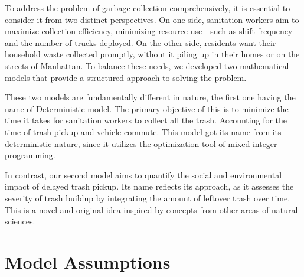 \documentclass{article}
\begin{document}

To address the problem of garbage collection comprehensively, it is essential to consider it from two distinct perspectives. On one side, sanitation workers aim to maximize collection efficiency, minimizing resource use—such as shift frequency and the number of trucks deployed. On the other side, residents want their household waste collected promptly, without it piling up in their homes or on the streets of Manhattan. To balance these needs, we developed two mathematical models that provide a structured approach to solving the problem.

These two models are fundamentally different in nature, the first one having the name of Deterministic model. The primary objective of this is to minimize the time it takes for sanitation workers to collect all the trash. Accounting for the time of trash pickup and vehicle commute. This model got its name from its deterministic nature, since it utilizes the optimization tool of mixed integer programming.

In contrast, our second model aims to quantify the social and environmental impact of delayed trash pickup. Its name reflects its approach, as it assesses the severity of trash buildup by integrating the amount of leftover trash over time. This is a novel and original idea inspired by concepts from other areas of natural sciences.
\newpage

\section{Model Assumptions}
\end{document}
